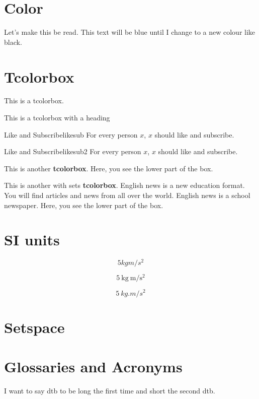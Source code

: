 \documentclass[a4paper]{ctexart}
\begin{document}
\section{Color}
Let's make {\color{red} this} be read.  \color{blue} This text will be blue until I change to a new colour like \color{black} black. 

\section{Tcolorbox}

\begin{tcolorbox}
This is a tcolorbox.
\end{tcolorbox}

\begin{tcolorbox}[colback=red!5!white,colframe=red!50!black,title=My nice heading]
This is a tcolorbox with a heading
\end{tcolorbox}

\begin{theo}{Like and Subscribe}{likesub}
For every person $x$, $x$ should like and subscribe. 

\end{theo}

\begin{theo}{Like and Subscribe}{likesub2}
For every person $x$, $x$ should like and subscribe. 

\end{theo}
\begin{tcolorbox}[title=My nice heading]
This  is  another  \textbf{tcolorbox}.
\tcblower
Here,  you  see  the  lower  part  of  the  box.
\end{tcolorbox}

\begin{tcolorbox}[colback=white!95!red,colframe=black!30!red,title=My  nice  heading]
This  is  another with sets  \textbf{tcolorbox}.
English news is a new education format. You will find articles and news from all over the world. English news is a school newspaper.
\tcblower
Here,  you  see  the  lower  part  of  the  box.
\end{tcolorbox}

\section{SI units}

\[5 kg m /s^2\]

\[5\ \mathrm{kg}\ \mathrm{m}/\mathrm{s}^2\]

\[5\ \si{kg.m/s^2}\]

\section{Setspace}

\lipsum[1-10]

\section{Glossaries and Acronyms}

I want to say \gls{dtb} to be long the first time and short the second \gls{dtb}. 






\printglossary[type=\acronymtype]
\end{document}
